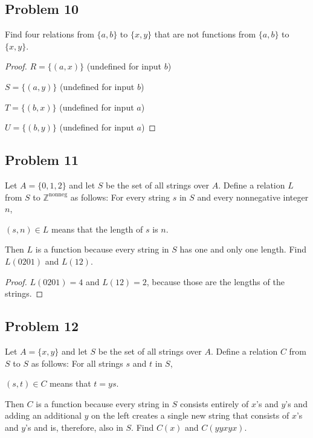 \documentclass[14pt]{extarticle}
\newcommand{\Z}{\mathbb{Z}}
\begin{document}
\subsection{Problem 10}
Find four relations from $\{a, b\}$ to $\{x, y\}$ that are not functions from
$\{a, b\}$ to $\{x, y\}$.

\begin{proof}
    $R = \{(a, x)\}$ (undefined for input $b$)

    $S = \{(a, y)\}$ (undefined for input $b$)

    $T = \{(b, x)\}$ (undefined for input $a$)

    $U = \{(b, y)\}$ (undefined for input $a$)
\end{proof}

\subsection{Problem 11}
Let $A = \{0, 1, 2\}$ and let $S$ be the set of all strings over $A$.
Define a relation $L$ from $S$ to $\Z^{\text{nonneg}}$ as follows:
For every string $s$ in $S$ and every nonnegative integer $n$,

\begin{center}
    $(s, n) \in L$ means that the length of $s$ is $n$.
\end{center}

Then $L$ is a function because every string in $S$ has one and only one length.
Find $L(0201)$ and $L(12)$.

\begin{proof}
    $L(0201) = 4$ and $L(12) = 2$, because those are the lengths of the strings.
\end{proof}

\subsection{Problem 12}
Let $A = \{x, y\}$ and let $S$ be the set of all strings over $A$. Define
a relation $C$ from $S$ to $S$ as follows: For all strings $s$ and $t$ in $S$,

\begin{center}
    $(s, t) \in C$ means that $t = ys$.
\end{center}

Then $C$ is a function because every string in $S$ consists entirely of $x$’s
and $y$’s and adding an additional $y$ on the left creates a single new string
that consists of $x$’s and $y$’s and is, therefore, also in $S$.
Find $C(x)$ and $C(yyxyx)$.
\end{document}

